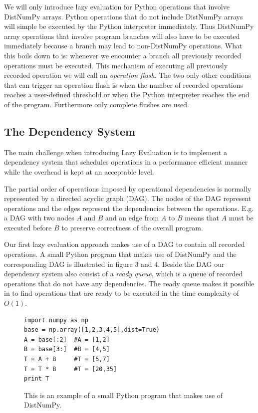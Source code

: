 \documentclass[preprint]{../PGAS10/sigplanconf}
\begin{document}
We will only introduce lazy evaluation for Python operations that involve DistNumPy arrays. Python operations that do not include DistNumPy arrays will simple be executed by the Python interpreter immediately. Thus DistNumPy array operations that involve program branches will also have to be executed immediately because a branch may lead to non-DistNumPy operations. What this boils down to is: whenever we encounter a branch all previously recorded operations must be executed. This mechanism of executing all previously recorded operation we will call an \emph{operation flush}. The two only other conditions that can trigger an operation flush is when the number of recorded operations reaches a user-defined threshold or when the Python interpreter reaches the end of the program. Furthermore only complete flushes are used.


\subsection{The Dependency System}
The main challenge when introducing Lazy Evaluation is to implement a dependency system that schedules operations in a performance efficient manner while the overhead is kept at an acceptable level.

The partial order of operations imposed by operational dependencies is normally represented by a directed acyclic graph (DAG)\cite{AhSeUl86}. The nodes of the DAG represent operations and the edges represent the dependencies between the operations. E.g. a DAG with two nodes $A$ and $B$ and an edge from $A$ to $B$ means that $A$ must be executed before $B$ to preserve correctness of the overall program. 

Our first lazy evaluation approach makes use of a DAG to contain all recorded operations. A small Python program that makes use of DistNumPy and the corresponding DAG is illustrated in figure 3 and 4. Beside the DAG our dependency system also consist of a \emph{ready queue}, which is a queue of recorded operations that do not have any dependencies. The ready queue makes it possible in to find operations that are ready to be executed in the time complexity of $O(1)$.


\begin{figure}
\begin{lstlisting}
import numpy as np
base = np.array([1,2,3,4,5],dist=True)
A = base[:2]  #A = [1,2]
B = base[3:]  #B = [4,5]
T = A + B     #T = [5,7]
T = T * B	  #T = [20,35]
print T
\end{lstlisting}
 \caption{This is an example of a small Python program that makes use of DistNumPy.}
 \label{lst:code_eg}
\end{figure}
\end{document}
